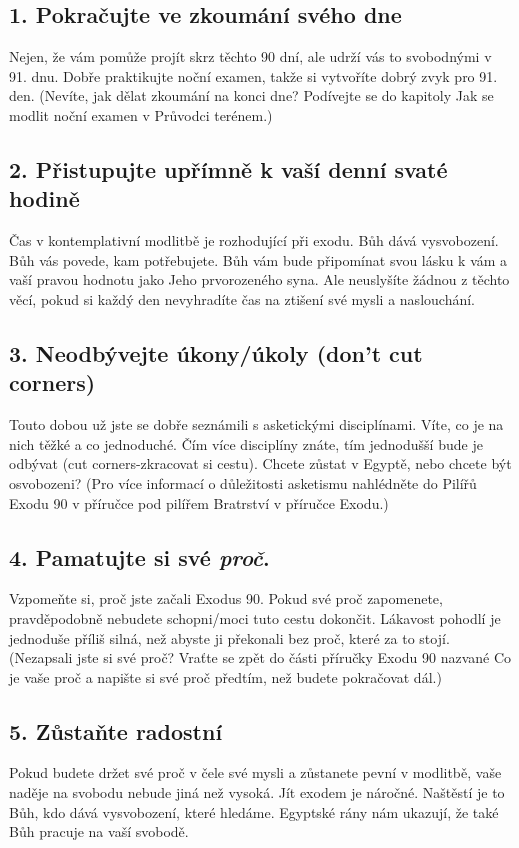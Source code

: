 \documentclass[11pt]{article}
\begin{document}
\subsection*{1. Pokračujte ve zkoumání svého dne}
Nejen, že vám pomůže projít skrz těchto 90 dní, ale udrží vás to svobodnými v 91. dnu. Dobře praktikujte noční examen, takže si vytvoříte dobrý zvyk pro 91. den. (Nevíte, jak dělat zkoumání na konci dne? Podívejte se do kapitoly Jak se modlit noční examen v Průvodci terénem.)
\subsection*{2. Přistupujte upřímně k vaší denní svaté hodině}
Čas v kontemplativní modlitbě je rozhodující při exodu. Bůh dává vysvobození. Bůh vás povede, kam potřebujete. Bůh vám bude připomínat svou lásku k vám a vaší pravou hodnotu jako Jeho prvorozeného syna. Ale neuslyšíte žádnou z těchto věcí, pokud si každý den nevyhradíte čas na ztišení své mysli a naslouchání.
\subsection*{3. Neodbývejte úkony/úkoly (don’t cut corners)}
Touto dobou už jste se dobře seznámili s asketickými disciplínami. Víte, co je na nich těžké a co jednoduché. Čím více disciplíny znáte, tím jednodušší bude je odbývat (cut corners-zkracovat si cestu). Chcete zůstat v Egyptě, nebo chcete být osvobozeni? (Pro více informací o důležitosti asketismu nahlédněte do Pilířů Exodu 90 v příručce pod pilířem Bratrství v příručce Exodu.)
\subsection*{4. Pamatujte si své \textit{proč}.}
Vzpomeňte si, proč jste začali Exodus 90. Pokud své proč zapomenete, pravděpodobně nebudete schopni/moci tuto cestu dokončit. Lákavost pohodlí je jednoduše příliš silná, než abyste ji překonali bez proč, které za to stojí. (Nezapsali jste si své proč? Vraťte se zpět do části příručky Exodu 90 nazvané Co je vaše proč a napište si své proč předtím, než budete pokračovat dál.)
\subsection*{5. Zůstaňte radostní}
Pokud budete držet své proč v čele své mysli a zůstanete pevní v modlitbě, vaše naděje na svobodu nebude jiná než vysoká. Jít exodem je náročné. Naštěstí je to Bůh, kdo dává vysvobození, které hledáme. Egyptské rány nám ukazují, že také Bůh pracuje na vaší svobodě.
\end{document}

